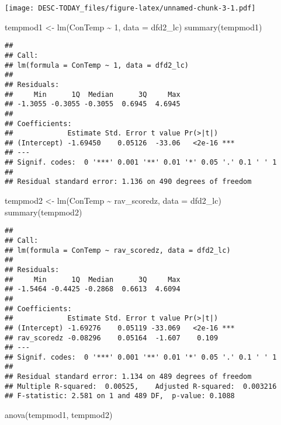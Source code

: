 \documentclass[
]{article}
\newenvironment{Shaded}{\begin{snugshade}}{\end{snugshade}}
\newcommand{\AttributeTok}[1]{\textcolor[rgb]{0.77,0.63,0.00}{#1}}
\newcommand{\DecValTok}[1]{\textcolor[rgb]{0.00,0.00,0.81}{#1}}
\newcommand{\FunctionTok}[1]{\textcolor[rgb]{0.00,0.00,0.00}{#1}}
\newcommand{\NormalTok}[1]{#1}
\newcommand{\OtherTok}[1]{\textcolor[rgb]{0.56,0.35,0.01}{#1}}
\newcommand{\SpecialCharTok}[1]{\textcolor[rgb]{0.00,0.00,0.00}{#1}}
\begin{document}
\texttt{[image: DESC-TODAY\_files/figure-latex/unnamed-chunk-3-1.pdf]}

\begin{Shaded}
\begin{Highlighting}[]
\NormalTok{tempmod1 }\OtherTok{\textless{}{-}} \FunctionTok{lm}\NormalTok{(ConTemp }\SpecialCharTok{\textasciitilde{}} \DecValTok{1}\NormalTok{, }\AttributeTok{data =}\NormalTok{ dfd2\_lc)}
\FunctionTok{summary}\NormalTok{(tempmod1)}
\end{Highlighting}
\end{Shaded}

\begin{verbatim}
## 
## Call:
## lm(formula = ConTemp ~ 1, data = dfd2_lc)
## 
## Residuals:
##     Min      1Q  Median      3Q     Max 
## -1.3055 -0.3055 -0.3055  0.6945  4.6945 
## 
## Coefficients:
##             Estimate Std. Error t value Pr(>|t|)    
## (Intercept) -1.69450    0.05126  -33.06   <2e-16 ***
## ---
## Signif. codes:  0 '***' 0.001 '**' 0.01 '*' 0.05 '.' 0.1 ' ' 1
## 
## Residual standard error: 1.136 on 490 degrees of freedom
\end{verbatim}

\begin{Shaded}
\begin{Highlighting}[]
\NormalTok{tempmod2 }\OtherTok{\textless{}{-}} \FunctionTok{lm}\NormalTok{(ConTemp }\SpecialCharTok{\textasciitilde{}}\NormalTok{ rav\_scoredz, }\AttributeTok{data =}\NormalTok{ dfd2\_lc)}
\FunctionTok{summary}\NormalTok{(tempmod2)}
\end{Highlighting}
\end{Shaded}

\begin{verbatim}
## 
## Call:
## lm(formula = ConTemp ~ rav_scoredz, data = dfd2_lc)
## 
## Residuals:
##     Min      1Q  Median      3Q     Max 
## -1.5464 -0.4425 -0.2868  0.6613  4.6094 
## 
## Coefficients:
##             Estimate Std. Error t value Pr(>|t|)    
## (Intercept) -1.69276    0.05119 -33.069   <2e-16 ***
## rav_scoredz -0.08296    0.05164  -1.607    0.109    
## ---
## Signif. codes:  0 '***' 0.001 '**' 0.01 '*' 0.05 '.' 0.1 ' ' 1
## 
## Residual standard error: 1.134 on 489 degrees of freedom
## Multiple R-squared:  0.00525,    Adjusted R-squared:  0.003216 
## F-statistic: 2.581 on 1 and 489 DF,  p-value: 0.1088
\end{verbatim}

\begin{Shaded}
\begin{Highlighting}[]
\FunctionTok{anova}\NormalTok{(tempmod1, tempmod2)}
\end{Highlighting}
\end{Shaded}
\end{document}
